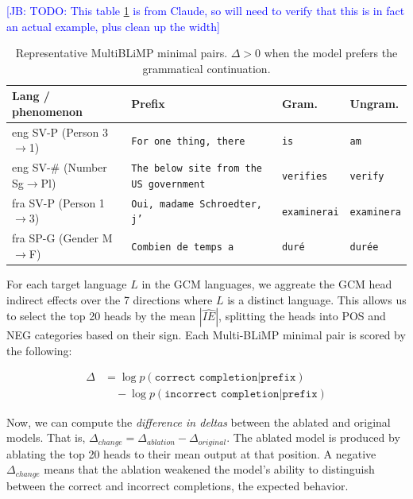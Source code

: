 \documentclass[11pt]{article}
\newcommand{\jb}[1]{\textcolor{blue}{[JB: #1]}}
\begin{document}
\jb{TODO: This table \ref{tab:multiblimp-examples} is from Claude, so will need to verify that this is in fact an actual example, plus clean up the width}
\begin{table}[t]
\centering
\small
\setlength{\tabcolsep}{3pt}
\renewcommand{\arraystretch}{1.08}
\begin{tabularx}{\linewidth}{@{}l X l l@{}}
\toprule
Lang / phenomenon & Prefix & Gram. & Ungram. \\
\midrule
eng SV-P (Person 3$\to$1) &
\texttt{For one thing, there} &
\texttt{is} &
\texttt{am} \\

eng SV-\# (Number Sg$\to$Pl) &
\texttt{The below site from the US government} &
\texttt{verifies} &
\texttt{verify} \\

fra SV-P (Person 1$\to$3) &
\texttt{Oui, madame Schroedter, j'} &
\texttt{examinerai} &
\texttt{examinera} \\

fra SP-G (Gender M$\to$F) &
\texttt{Combien de temps a} &
\texttt{duré} &
\texttt{durée} \\
\bottomrule
\end{tabularx}
\caption{Representative MultiBLiMP minimal pairs. $\Delta>0$ when the model prefers the grammatical continuation.}
\label{tab:multiblimp-examples}
\end{table}

For each target language $L$ in the GCM languages, we aggreate the GCM head indirect effects over the 7 directions where $L$ is a distinct language. This allows us to select the top 20 heads by the mean $|\widehat{IE}|$, splitting the heads into POS and NEG categories based on their sign. Each Multi-BLiMP minimal pair is scored by the following:

\begin{equation}
\begin{split}
\Delta &= \log p(\texttt{correct completion} | \texttt{prefix}) \\ & \quad - \log p(\texttt{incorrect completion} | \texttt{prefix})
\end{split}
\end{equation}

Now, we can compute the \emph{difference in deltas} between the ablated and original models. That is, $\Delta_{change} = \Delta_{ablation} - \Delta_{original}$. The ablated model is produced by ablating the top 20 heads to their mean output at that position. A negative $\Delta_{change}$ means that the ablation weakened the model's ability to distinguish between the correct and incorrect completions, the expected behavior.
\end{document}

